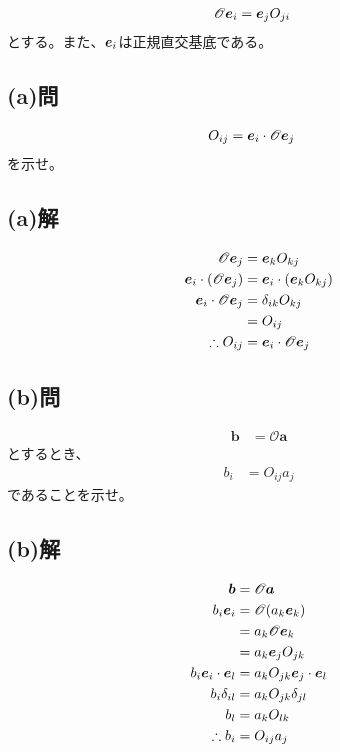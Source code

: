 \begin{align}
	\mathscr{O}{\bm{e}_{i}}
&=
	{\bm{e}_{j}} O_{ji}
\end{align}
とする。また、${\bm{e}_{i}}$は正規直交基底である。

\subsection{(a)問}
\begin{align}
	O_{ij}
&=
	{\bm{e}_{i}}\cdot \mathscr{O} {\bm{e}_{j}}
\end{align}
を示せ。

\subsection{(a)解}
\begin{align}
	\mathscr{O}\e{j}
&=
	\e{k} O_{kj} \\
%
%
	\e{i}\cdot \left(\mathscr{O}\e{j}\right)
&=
	\e{i}\cdot \left(\e{k} O_{kj}\right) \\
%
%
	\e{i}\cdot \mathscr{O}\e{j}
&=
	\delta_{ik} O_{kj} \\
%
%
&=
	O_{ij} \\
%
%
	\therefore
	O_{ij}
&=
	\e{i}\cdot \mathscr{O}\e{j}
\end{align}


\subsection{(b)問}
\begin{align}
	\bm{b}
&=
	\mathscr{O}\bm{a}
\end{align}
とするとき、
\begin{align}
	b_i
&=
	O_{ij} a_{j}
\end{align}
であることを示せ。

\subsection{(b)解}
\begin{align}
	\bm{b}
&=
	\mathscr{O}\bm{a} \\
%
%
	b_i \e{i}
&=
	\mathscr{O}(a_k \e{k}) \\
%
%
&=
	a_k \mathscr{O} \e{k} \\
%
%
&=
	a_k \e{j} O_{jk} \\
%
%
	b_i \e{i}\cdot \e{l}
&=
	a_k O_{jk} \e{j}\cdot \e{l} \\
%
%
	b_i \delta_{il}
&=
	a_k O_{jk} \delta_{jl} \\
%
%
	b_l
&=
	a_k O_{lk} \\
%
%
	\therefore
	b_i
&=
	O_{ij} a_j
\end{align}

